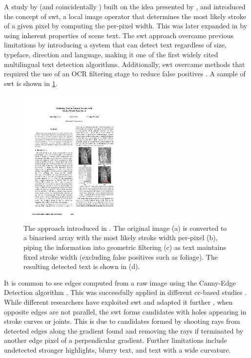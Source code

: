 A study by \citet{Epshtein:2010tj} (and coincidentally \citet{Zhang:2011cl}) built on the idea presented by \citeauthor{Subramanian:2007tf}, and introduced the concept of \gls{swt}, a local image operator that determines the most likely stroke of a given pixel by computing the per-pixel width. This was later expanded in \citet{Srivastav:2008ge} by using inherent properties of scene text. The \gls{swt} approach overcame previous limitations by introducing a system that can detect text regardless of size, typeface, direction and language, making it one of the first widely cited multilingual text detection algorithms. Additionally, \gls{swt} overcame methods that required the use of an OCR filtering stage to reduce false positives \citep{Chen:2004tx, XiangrongChen:2004ha, Ye:2005wu}. A sample of \gls{swt} is shown in \cref{fig:background:detection:cc:epshtein2010_swt}.

\begin{figure}[h]
  \centering
  \includegraphics[width=0.47\textwidth]{images/background/epshtein2010_swt}
  \caption[Stroke Width Transformation from \citet{Epshtein:2010tj}]{The  approach introduced in \citep{Epshtein:2010tj}. The original image (a) is converted to a binarised array with the most likely stroke width per-pixel (b), piping the information into geometric filtering (c) as text maintains fixed stroke width (excluding false positives such as foliage). The resulting detected text is shown in (d).}
  \label{fig:background:detection:cc:epshtein2010_swt}
\end{figure}

It is common to see edges computed from a raw image using the Canny-Edge Detection algorithm \citep{Canny:1986uw}. This was successfully applied in different \gls{cc}-based studies \citep{Epshtein:2010tj, Chen:2011ul, Zhang:2010wa}. While different researchers have exploited \gls{swt} and adapted it further \cite{Shivakumara:2011dn, Zhang:2011cl, Srivastav:2008ge}, when opposite edges are not parallel, the \gls{swt} forms candidates with holes appearing in stroke curves or joints. This is due to candidates formed by shooting rays from detected edges along the gradient found and removing the rays if terminated by another edge pixel of a perpendicular gradient. Further limitations include undetected stronger highlights, blurry text, and text with a wide curvature.

